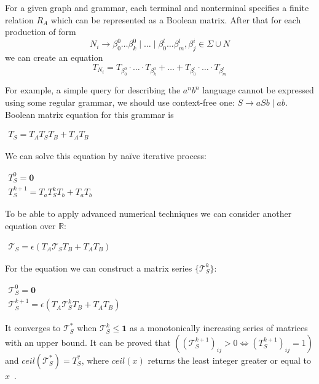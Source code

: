 \documentclass[sigconf]{acmart}
\begin{document}
For a given graph and grammar, each terminal and nonterminal specifies a finite relation $R_A$ which can be represented as a Boolean matrix.
After that for each production of form $$N_i \to \beta^0_0 \dots \beta^0_k \mid \ldots \mid \beta^l_0 \dots \beta^l_m, \beta^i_j \in \Sigma \cup N$$ we can create an equation $$T_{N_i} = T_{\beta^0_0}\cdot \ldots \cdot T_{\beta^0_k} + \ldots + T_{\beta^l_0}\cdot \ldots \cdot T_{\beta^l_m}$$

For example, a simple query for describing the $a^nb^n$ language cannot be expressed using some regular grammar, we should use context-free one: $S \rightarrow aSb \mid ab$. 
Boolean matrix equation for this grammar is
\begin{center}
\(
\left.
\begin{array}{l}
T_S = T_AT_ST_B + T_AT_B
\end{array}
\right.
\)
\end{center}

We can solve this equation by na\"ive iterative process:
\begin{center}
\(
\left.
\begin{array}{l}
T_S^0 = \mathbf{0} \\
T_S^{k+1} = T_a T_S^k T_b + T_a T_b
\end{array}
\right.
\)
\end{center}

To be able to apply advanced numerical techniques we can consider another equation over $\mathbb{R}$:

\begin{center}
\(
\left.
\begin{array}{l}
\mathcal{T}_S = \epsilon(T_A \mathcal{T}_S T_B + T_A T_B)
\end{array}
\right.
\)
\end{center}

For the equation we can construct a matrix series $\{ \mathcal{T}_S^{k}\}$:

\begin{center}
\(
\left.
\begin{array}{c}
\mathcal{T}_S^0 = \mathbf{0} \\
\mathcal{T}_S^{k+1} = \epsilon(T_A \mathcal{T}_S^k T_B + T_A T_B)
\end{array}
\right.
\)
\end{center}

It converges to $\mathcal{T}_S^*$ when $\mathcal{T}_S^{k} \leq \textbf{1}$ as a monotonically increasing series of matrices with an upper bound.
It can be proved that $((\mathcal{T}_S^{k+1})_{ij} > 0 \iff (T_S^{k+1})_{ij} = 1)$ and $ceil(\mathcal{T}_S^*) = T_S^*$, where $ceil(x)$ returns the least integer greater or equal to $x$~\cite{sato2017linear}.
\end{document}
